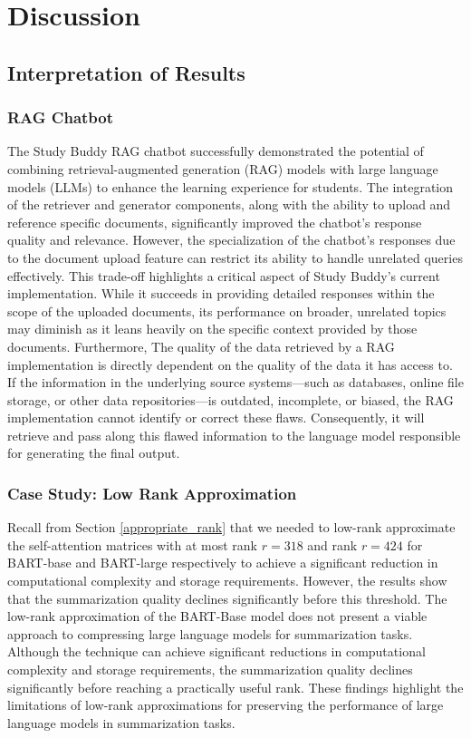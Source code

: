 \chapter{Discussion}

\section{Interpretation of Results}
    \subsection{RAG Chatbot}
        The Study Buddy RAG chatbot successfully demonstrated the potential of combining retrieval-augmented generation (RAG) models with large language models (LLMs) to enhance the learning experience for students. The integration of the retriever and generator components, along with the ability to upload and reference specific documents, significantly improved the chatbot's response quality and relevance. However, the specialization of the chatbot's responses due to the document upload feature can restrict its ability to handle unrelated queries effectively. 
        This trade-off highlights a critical aspect of Study Buddy's current implementation. 
        While it succeeds in providing detailed responses within the scope of the uploaded documents, its performance on broader, unrelated topics may diminish as it leans heavily on the specific context provided by those documents. Furthermore, The quality of the data retrieved by a RAG implementation is directly dependent on the quality of the data it has access to. If the information in the underlying source systems—such as databases, online file storage, or other data repositories—is outdated, incomplete, or biased, the RAG implementation cannot identify or correct these flaws. 
        Consequently, it will retrieve and pass along this flawed information to the language model responsible for generating the final output.

    \subsection{Case Study: Low Rank Approximation}
        Recall from Section \ref{appropriate_rank} that we needed to low-rank approximate the self-attention matrices with at most rank \(r = 318\) and rank \(r = 424\) for BART-base and BART-large respectively to achieve a significant reduction in computational complexity and storage requirements. However, the results show that the summarization quality declines significantly before this threshold.
        The low-rank approximation of the BART-Base model does not present a viable approach to compressing large language models for summarization tasks. Although the technique can achieve significant reductions in computational complexity and storage requirements, the summarization quality declines significantly before reaching a practically useful rank. These findings highlight the limitations of low-rank approximations for preserving the performance of large language models in summarization tasks.

